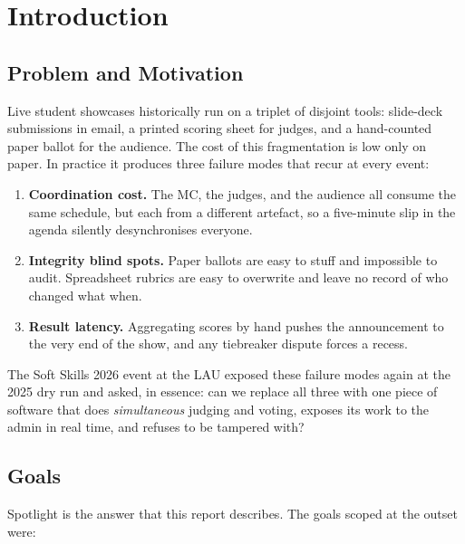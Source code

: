 \section{Introduction}
\label{sec:introduction}

\subsection{Problem and Motivation}

Live student showcases historically run on a triplet of disjoint tools:
slide-deck submissions in email, a printed scoring sheet for judges, and a
hand-counted paper ballot for the audience. The cost of this fragmentation is
low only on paper. In practice it produces three failure modes that recur at
every event:

\begin{enumerate}[leftmargin=*]
  \item \textbf{Coordination cost.} The MC, the judges, and the audience all
        consume the same schedule, but each from a different artefact, so a
        five-minute slip in the agenda silently desynchronises everyone.
  \item \textbf{Integrity blind spots.} Paper ballots are easy to stuff and
        impossible to audit. Spreadsheet rubrics are easy to overwrite and
        leave no record of who changed what when.
  \item \textbf{Result latency.} Aggregating scores by hand pushes the
        announcement to the very end of the show, and any tiebreaker dispute
        forces a recess.
\end{enumerate}

The Soft Skills 2026 event at the LAU exposed these failure modes again at the
2025 dry run and asked, in essence: can we replace all three with one piece of
software that does \emph{simultaneous} judging and voting, exposes its work to
the admin in real time, and refuses to be tampered with?

\subsection{Goals}

Spotlight is the answer that this report describes. The goals scoped at the
outset were:

